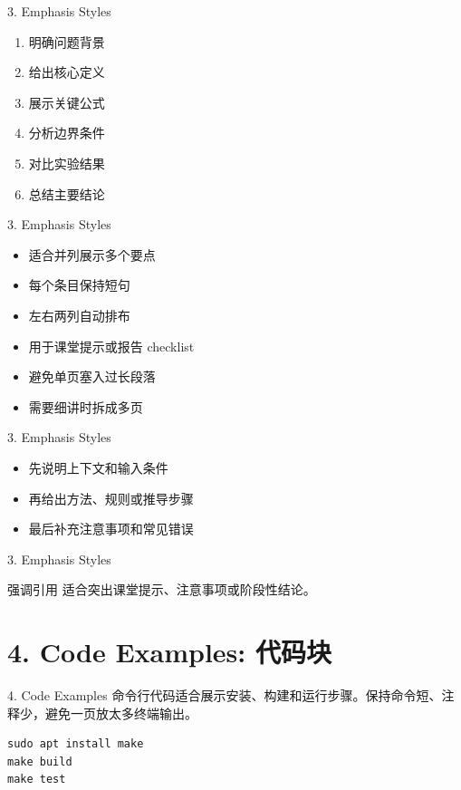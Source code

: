 \documentclass[aspectratio=169,10pt]{beamer}
\begin{document}
\begin{frame}[fragile]{3. Emphasis Styles}
\begin{enumerate}
\def\labelenumi{\arabic{enumi}.}
\item
  明确问题背景
\item
  给出核心定义
\item
  展示关键公式
\item
  分析边界条件
\item
  对比实验结果
\item
  总结主要结论
\end{enumerate}
\end{frame}

\begin{frame}[fragile]{3. Emphasis Styles}
\begin{itemize}
\item
  适合并列展示多个要点
\item
  每个条目保持短句
\item
  左右两列自动排布
\item
  用于课堂提示或报告 checklist
\item
  避免单页塞入过长段落
\item
  需要细讲时拆成多页
\end{itemize}
\end{frame}

\begin{frame}[fragile]{3. Emphasis Styles}
\begin{itemize}
\item
  先说明上下文和输入条件
\item
  再给出方法、规则或推导步骤
\item
  最后补充注意事项和常见错误
\end{itemize}
\end{frame}

\begin{frame}[t,fragile]{3. Emphasis Styles}
\begin{vspquote}{强调引用}
适合突出课堂提示、注意事项或阶段性结论。
\end{vspquote}
\end{frame}

\section{4. Code Examples: 代码块}

\begin{frame}[fragile]{4. Code Examples}
命令行代码适合展示安装、构建和运行步骤。保持命令短、注释少，避免一页放太多终端输出。

\begin{lstlisting}
sudo apt install make
make build
make test
\end{lstlisting}
\end{frame}
\end{document}
